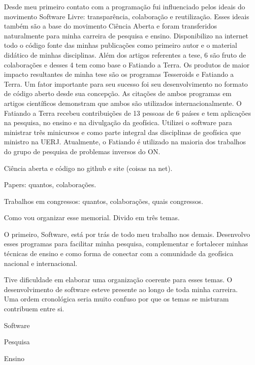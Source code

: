 Desde meu primeiro contato com a programação fui influenciado pelos ideais do
movimento Software Livre: transparência, colaboração e reutilização. Esses
ideais também são a base do movimento Ciência Aberta e foram transferidos
naturalmente para minha carreira de pesquisa e ensino. Disponibilizo na
internet todo o código fonte das minhas publicações como primeiro autor e o
material didático de minhas disciplinas. Além dos artigos referentes a tese, 6
são fruto de colaborações e desses 4 tem como base o Fatiando a Terra.
Os produtos de maior impacto resultantes de minha tese são os programas
Tesseroids e Fatiando a Terra. Um fator importante para seu sucesso foi seu
desenvolvimento no formato de código aberto desde sua concepção. As citações de
ambos programas em artigos científicos demonstram que ambos são utilizados
internacionalmente. O Fatiando a Terra recebeu contribuições de 13 pessoas de 6
países e tem aplicações na pesquisa, no ensino e na divulgação da geofísica.
Utilizei o software para ministrar três minicursos e como parte integral das
disciplinas de geofísica que ministro na UERJ. Atualmente, o Fatiando é
utilizado na maioria dos trabalhos do grupo de pesquisa de problemas inversos
do ON.







Ciência aberta e código no github e site (coisas na net).

Papers: quantos, colaborações.

Trabalhos em congressos: quantos, colaborações, quais congressos.

Como vou organizar esse memorial.
Divido em três temas.

O primeiro, Software, está por trás de todo meu trabalho nos demais.
Desenvolvo esses programas para facilitar minha pesquisa, complementar e
fortalecer minhas técnicas de ensino e como forma de conectar com a comunidade
da geofísica nacional e internacional.

Tive dificuldade em elaborar uma organização coerente para esses temas.
O desenvolvimento de software esteve presente ao longo de toda minha carreira.
Uma ordem cronológica seria muito confuso por que os temas se misturam contribuem entre si.

Software

Pesquisa

Ensino

\citet{uieda2016a}

